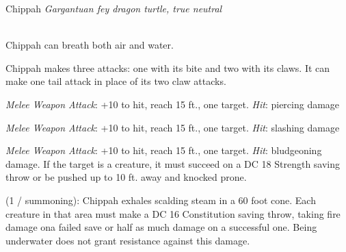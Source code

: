 \documentclass[letterpaper,10pt,twoside,twocolumn,openany]{book}
\begin{document}
\begin{monsterbox}{ Chippah}
	\textit{Gargantuan fey dragon turtle, true neutral}\\
	\hline%
	\basics[%
	armorclass = 17 (natural armor),
	hitpoints  = \dice{14d20 + 55},
	speed      = {20 ft., swim 40 ft.}
	]
	\hline%
	\stats[
    STR = \stat{22}, %
    DEX = \stat{8},
    CON = \stat{20},
    INT = \stat{7},
    WIS = \stat{12},
    CHA = \stat{8}
	]
	\hline%
	\details[%
	skills = {Athletics + 11},
	senses = {darkvision 120 ft., pp 11},
	languages = {Dragon Turtle, understands Common, Draconic, and Sylvan but cannot speak},
	challenge = 12
	]
	\hline \\[1mm]
	\begin{monsteraction}[Amphibious]
		Chippah can breath both air and water.
	\end{monsteraction}
	
	\begin{monsteraction}[Multiattack]
		Chippah makes three attacks: one with its bite and two with its claws. It can make one tail attack in place of its two claw attacks.
	\end{monsteraction}
	
	\begin{monsteraction}[Bite]
		\emph{Melee Weapon Attack}: +10 to hit, reach 15 ft., one target. \emph{Hit}:  piercing damage
	\end{monsteraction}

	\begin{monsteraction}[Claw]
		\emph{Melee Weapon Attack}: +10 to hit, reach 15 ft., one target. \emph{Hit}:  slashing damage
	\end{monsteraction}

	\begin{monsteraction}[Tail]
		\emph{Melee Weapon Attack}: +10 to hit, reach 15 ft., one target. \emph{Hit}:  bludgeoning damage.
		If the target is a creature, it must succeed on a DC 18 Strength saving throw or be pushed up to 10 ft. away and knocked prone.
	\end{monsteraction}
	
	\begin{monsteraction}
		(1 / summoning): Chippah exhales scalding steam in a 60 foot cone. Each creature in that area must make a DC 16 Constitution saving throw, taking  fire damage ona failed save or half as much damage on a successful one. 
		Being underwater does not grant resistance against this damage.
	\end{monsteraction}
	
\end{monsterbox}
\end{document}

